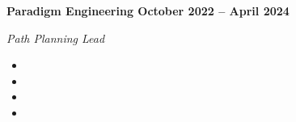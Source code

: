\vspace{0.1cm}
\textbf{Paradigm Engineering \hfill October 2022 -- April 2024} \par
\textit{Path Planning Lead} \par
\begin{itemize}
	\item
  \item 
  \item 
  \item 
\end{itemize} \par